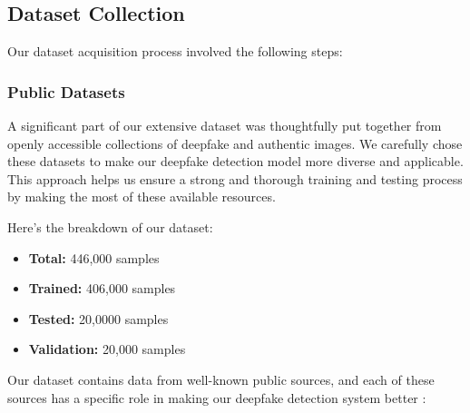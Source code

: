\subsection{Dataset Collection}

\noindent Our dataset acquisition process involved the following steps:


\subsubsection{Public Datasets}
A significant part of our extensive dataset was thoughtfully put together from openly accessible collections of deepfake and authentic images. We carefully chose these datasets to make our deepfake detection model more diverse and applicable. This approach helps us ensure a strong and thorough training and testing process by making the most of these available resources.

Here's the breakdown of our dataset:
\begin{itemize}
    \item \textbf{Total:} 446,000 samples
    \item \textbf{Trained:} 406,000 samples
    \item \textbf{Tested:} 20,0000 samples
    \item \textbf{Validation:} 20,000 samples
\end{itemize}
Our dataset contains data from well-known public sources, and each of these sources has a specific role in making our deepfake detection system better :

